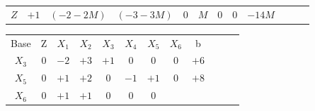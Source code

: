\begin{frame}
{\begin{table}
\begin{tabular}{c c c c c c c c c c c c}
				\cellcolor{blue!100} \color{white} $\scriptstyle Z$
				& \cellcolor{yellow!50} $\scriptstyle +1$
				& \cellcolor{yellow!50} $\scriptstyle (-2-2M)$
				& \cellcolor{yellow!50} $\scriptstyle (-3-3M)$
				& \cellcolor{yellow!50} $\scriptstyle 0$
				& \cellcolor{yellow!50} $\scriptstyle M$
				& \cellcolor{yellow!50} $\scriptstyle 0$
				& \cellcolor{yellow!50} $\scriptstyle 0$ 
				& \cellcolor{yellow!50} $\scriptstyle -14M$  \\
			\end{tabular}
		\end{table}			
	}
	{
		\begin{table}		
			\begin{tabular}{c c c c c c c c c c c c}
				\cline{1-8} 
				\cellcolor{blue!100} \color{white} \scriptsize Base 
				&\cellcolor{blue!100} \color{white} \scriptsize Z 
				&\cellcolor{blue!100} \color{white} $\scriptstyle X_1$ 
				&\cellcolor{blue!100} \color{white} $\scriptstyle X_2$ 
				&\cellcolor{blue!100} \color{red}   $\scriptstyle X_3$ 
				&\cellcolor{blue!100} \color{white} $\scriptstyle X_4$ 
				&\cellcolor{blue!100} \color{red}   $\scriptstyle X_5$ 
				&\cellcolor{blue!100} \color{red}   $\scriptstyle X_6$ 
				&\cellcolor{blue!100} \color{white} \scriptsize b
				&
				&
				& \\
				\cellcolor{blue!100} \color{red} $\scriptstyle X_3$
				& \cellcolor{yellow!50} $\scriptstyle 0$
				& \cellcolor{yellow!50} $\scriptstyle -2$
				& \cellcolor{yellow!50} $\scriptstyle +3$
				& \cellcolor{yellow!50} $\scriptstyle +1$
				& \cellcolor{yellow!50} $\scriptstyle 0$
				& \cellcolor{yellow!50} $\scriptstyle 0$
				& \cellcolor{yellow!50} $\scriptstyle 0$
				& \cellcolor{yellow!50} $\scriptstyle +6$ \\
			    \cellcolor{blue!100} \color{red} $\scriptstyle X_5$
				& \cellcolor{yellow!50} $\scriptstyle 0$
				& \cellcolor{yellow!50} $\scriptstyle +1$
				& \cellcolor{yellow!50} $\scriptstyle +2$
				& \cellcolor{yellow!50} $\scriptstyle 0$			
				& \cellcolor{yellow!50} $\scriptstyle -1$
				& \cellcolor{yellow!50} $\scriptstyle +1$
				& \cellcolor{yellow!50} $\scriptstyle 0$ 
				& \cellcolor{yellow!50} $\scriptstyle +8$ \\
				\cellcolor{blue!100} \color{red} $\scriptstyle X_6$
				& \cellcolor{yellow!50} $\scriptstyle 0$
				& \cellcolor{yellow!50} $\scriptstyle +1$
				& \cellcolor{yellow!50} $\scriptstyle +1$
				& \cellcolor{yellow!50} $\scriptstyle 0$
				& \cellcolor{yellow!50} $\scriptstyle 0$
				& \cellcolor{yellow!50} $\scriptstyle 0$

\end{tabular}
\end{table}}
\end{frame}
